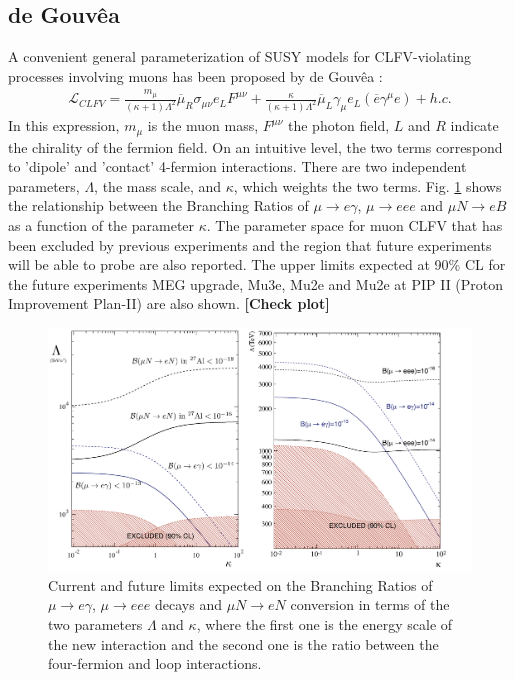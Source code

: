 \documentclass[12pt,a4paper,openright, oneside, titlepage]{book} %
\begin{document}
\subsection{de Gouv\^{e}a}
A convenient general parameterization of SUSY models for CLFV-violating processes involving muons has been proposed by de Gouv\^{e}a \cite{deGouvea}:
\begin{align}
\mathcal{L}_{CLFV}=
\frac{m_\mu}{(\kappa+1)\Lambda^2}\overline{\mu}_R\sigma_{\mu\nu}e_LF^{\mu\nu}+
\frac{\kappa}{(\kappa+1)\Lambda^2}\overline{\mu}_L\gamma_\mu e_L (\overline{e}\gamma^\mu e)+h.c.
\label{eq_deGouvea}
\end{align}
In this expression, $m_\mu$ is the muon mass, $F^{\mu\nu}$ the photon field, 
$L$ and $R$ indicate the chirality of the fermion field.
On an intuitive level, 
the two terms correspond to 'dipole' and 'contact' 4-fermion interactions.
There are two independent parameters,  $\Lambda$, the mass scale, and $\kappa$, 
which weights the two terms. 
Fig. \ref{_deGouvea} shows the relationship between 
the Branching Ratios of $\mu\rightarrow e\gamma$, $\mu\rightarrow eee$ 
and $\mu N \rightarrow e B$ as a function of the parameter $\kappa$. 
The parameter space for muon CLFV that has been excluded by previous experiments 
and the region that future experiments will be able to probe are also reported. 
The upper limits expected at 90\% CL for the future experiments MEG upgrade, 
Mu3e, Mu2e and Mu2e at PIP II (Proton Improvement Plan-II) are also shown. \textbf{[Check plot]}

\begin{figure}[h!]
\includegraphics[scale=0.8]{deGouvea}
\caption{Current and future limits expected on the Branching Ratios of 
$\mu\rightarrow e\gamma$,
$\mu\rightarrow eee$ decays and $\mu N \rightarrow e N$ conversion in terms 
of the two parameters $\Lambda$ and $\kappa$, where the first one is 
the energy scale of the new interaction and the second one is the ratio
between the four-fermion and loop interactions.}
\label{_deGouvea}
\end{figure}
\end{document}
